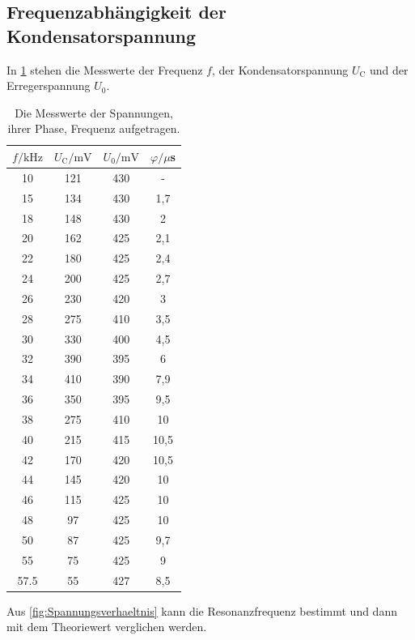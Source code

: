 \documentclass[titlepage = firstcover]{scrartcl}
\begin{document}
        \subsection{Frequenzabhängigkeit der Kondensatorspannung}
            In \ref{tab:Tabelle2} stehen die Messwerte der Frequenz $f$, der Kondensatorspannung $U_\text{C}$ und der Erregerspannung $U_0$.
            \begin{table}[h]
                \centering
                \caption{Die Messwerte der Spannungen, ihrer Phase, Frequenz aufgetragen.}
                \label{tab:Tabelle2}
                \begin{tabular}{c c c c}
                    \toprule
                    {$f / \text{kHz}$} & {$U_\text{C} / \text{mV}$} & {$U_0 / \text{mV}$} & {$\varphi / \mu$s} \\
                    \midrule
                    10   &  121 & 430 & -   \\
                    15   &  134 & 430 & 1,7 \\
                    18   &  148 & 430 & 2   \\
                    20   &  162 & 425 & 2,1 \\
                    22   &  180 & 425 & 2,4 \\
                    24   &  200 & 425 & 2,7 \\
                    26   &  230 & 420 & 3   \\
                    28   &  275 & 410 & 3,5 \\
                    30   &  330 & 400 & 4,5 \\
                    32   &  390 & 395 & 6   \\
                    34   &  410 & 390 & 7,9 \\
                    36   &  350 & 395 & 9,5 \\
                    38   &  275 & 410 & 10  \\
                    40   &  215 & 415 & 10,5\\
                    42   &  170 & 420 & 10,5\\
                    44   &  145 & 420 & 10  \\
                    46   &  115 & 425 & 10  \\
                    48   &  97  & 425 & 10  \\
                    50   &  87  & 425 & 9,7 \\
                    55   &  75  & 425 & 9   \\
                    57.5 &  55  & 427 & 8,5 \\
                    \bottomrule
                \end{tabular}
            \end{table}
            \FloatBarrier
            \noindent
            Aus \ref{fig:Spannungsverhaeltnis} kann die Resonanzfrequenz bestimmt und dann mit dem Theoriewert verglichen werden.
\end{document}
